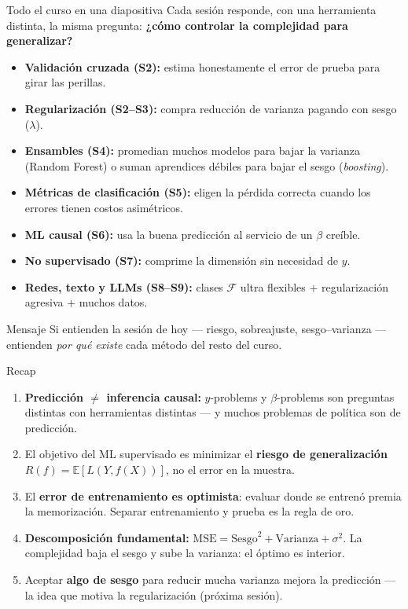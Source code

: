 \documentclass{beamer}
\newcommand{\E}{\mathbb{E}}
\newcommand{\1}{\mathbb{I}}
\newcommand{\MSE}{\mathrm{MSE}}
\begin{document}
\begin{frame}{Todo el curso en una diapositiva}
\small
Cada sesión responde, con una herramienta distinta, la misma pregunta: \textbf{¿cómo controlar la complejidad para generalizar?}
\pause
\begin{itemize}\itemsep5pt
  \item \textbf{Validación cruzada (S2):} estima honestamente el error de prueba para girar las perillas. \pause
  \item \textbf{Regularización (S2--S3):} compra reducción de varianza pagando con sesgo ($\lambda$). \pause
  \item \textbf{Ensambles (S4):} promedian muchos modelos para bajar la varianza (Random Forest) o suman aprendices débiles para bajar el sesgo (\emph{boosting}). \pause
  \item \textbf{Métricas de clasificación (S5):} eligen la pérdida correcta cuando los errores tienen costos asimétricos. \pause
  \item \textbf{ML causal (S6):} usa la buena predicción al servicio de un $\beta$ creíble. \pause
  \item \textbf{No supervisado (S7):} comprime la dimensión sin necesidad de $y$. \pause
  \item \textbf{Redes, texto y LLMs (S8--S9):} clases $\mathcal{F}$ ultra flexibles $+$ regularización agresiva $+$ muchos datos. \pause
\end{itemize}

\begin{block}{Mensaje}
Si entienden la sesión de hoy --- riesgo, sobreajuste, sesgo--varianza --- entienden \emph{por qué existe} cada método del resto del curso.
\end{block}
\end{frame}

\begin{frame}{Recap}
\small
\begin{enumerate}\itemsep8pt
  \item \textbf{Predicción $\neq$ inferencia causal:} $\hat{y}$-problems y $\beta$-problems son preguntas distintas con herramientas distintas --- y muchos problemas de política son de predicción.
  \item El objetivo del ML supervisado es minimizar el \textbf{riesgo de generalización} $R(f) = \E[L(Y, f(X))]$, no el error en la muestra.
  \item El \textbf{error de entrenamiento es optimista}: evaluar donde se entrenó premia la memorización. Separar entrenamiento y prueba es la regla de oro.
  \item \textbf{Descomposición fundamental:} $\MSE = \text{Sesgo}^2 + \text{Varianza} + \sigma^2$. La complejidad baja el sesgo y sube la varianza: el óptimo es interior.
  \item Aceptar \textbf{algo de sesgo} para reducir mucha varianza mejora la predicción --- la idea que motiva la regularización (próxima sesión).
\end{enumerate}
\end{frame}
\end{document}
